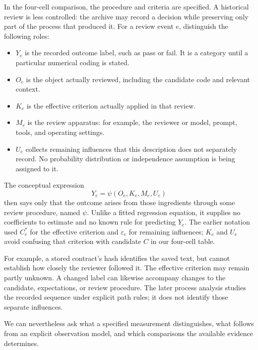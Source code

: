 In the four-cell comparison, the procedure and criteria are specified. A historical review is less controlled: the archive may record a decision while preserving only part of the process that produced it. For a review event $e$, distinguish the following roles:
\begin{itemize}
\item $Y_e$ is the recorded outcome label, such as pass or fail. It is a
category until a particular numerical coding is stated.
\item $O_e$ is the object actually reviewed, including the candidate code
and relevant context.
\item $K_e$ is the effective criterion actually applied in that review.
\item $M_e$ is the review apparatus: for example, the reviewer or model,
prompt, tools, and operating settings.
\item $U_e$ collects remaining influences that this description does not
separately record. No probability distribution or independence assumption
is being assigned to it.
\end{itemize}
The conceptual expression
\[
Y_e=\psi(O_e,K_e,M_e,U_e)
\]
then says only that the outcome arises from those ingredients through some
review procedure, named $\psi$. Unlike a fitted regression equation,
it supplies no coefficients to estimate and no known rule for predicting
$Y_e$. The earlier notation used $C_e^*$ for the effective criterion and
$\varepsilon_e$ for remaining influences; $K_e$ and $U_e$ avoid confusing
that criterion with candidate $C$ in our four-cell table.

For example, a stored contract's hash identifies the saved text, but cannot establish how closely the reviewer followed it. The effective criterion may remain partly unknown. A changed label can likewise accompany changes to the candidate, expectations, or review procedure. The later process analysis studies the recorded sequence under explicit path rules; it does not identify those separate influences.

We can nevertheless ask what a specified measurement distinguishes, what follows from an explicit observation model, and which comparisons the available evidence determines.